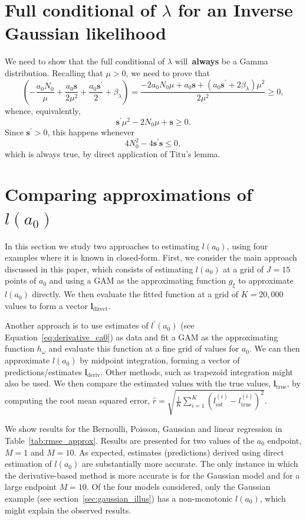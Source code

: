 \documentclass[a4paper, notitlepage, 11pt]{article}
\begin{document}
\section{Full conditional of $\lambda$ for an Inverse Gaussian likelihood}
\label{sec:full_cond_invGaussian}

We need to show that the full conditional of $\lambda$ will~\textbf{always} be a Gamma distribution.
Recalling that $\mu > 0$, we need to prove that 
\[ \left( -\frac{a_0N_0}{\mu} + \frac{a_0\boldsymbol s }{2\mu^2} + \frac{a_0\boldsymbol s^\prime}{2} + \beta_\lambda \right) = \frac{-2a_0N_0\mu + a_0\boldsymbol s + (a_0 \boldsymbol s^\prime + 2\beta_\lambda)\mu^2 }{2\mu^2} \geq 0,\]
whence, equivalently,
\[ \boldsymbol s^\prime\mu^2 -2N_0\mu + \boldsymbol s \geq 0. \]
Since $\boldsymbol s^\prime > 0$, this happens whenever
\[ 4N_0^2 - 4\boldsymbol s^\prime\boldsymbol s \leq 0, \]
which is always true, by direct application of Titu's lemma.


\section{Comparing approximations of $l(a_0)$}
\label{sec:derivative_only}

In this section we study two approaches to estimating $l(a_0)$, using four examples where it is known in closed-form.
First, we consider the main approach discussed in this paper, which consists of estimating $l(a_0)$ at a grid of $J = 15$ points of $a_0$ and using a GAM as the approximating function $g_\xi$ to approximate $l(a_0)$ directly.
We then evaluate the fitted function at a grid of $K = 20,000$ values to form a vector $\boldsymbol l_{\text{direct}}$.

Another approach is to use estimates of $l^\prime(a_0)$ (see Equation~\ref{eq:derivative_ca0}) as data and fit a GAM as the approximating function $h_\omega$ and evaluate this function at a fine grid of values for $a_0$.
We can then approximate $l(a_0)$ by midpoint integration, forming a vector of predictions/estimates $\boldsymbol l_{\text{deriv}}$.
Other methods, such as trapezoid integration might also be used.
We then compare the estimated values with the true values, $\boldsymbol l_{\text{true}}$, by computing the root mean squared error, $\hat{r} = \sqrt{\frac{1}{K} \sum_{i= 1}^K \left( l^{(i)}_{\text{est}} - l^{(i)}_{\text{true}} \right)^2 }$.

We show results for the Bernoulli, Poisson, Gaussian and linear regression in Table~\ref{tab:rmse_approx}.
Results are presented for two values of the $a_0$ endpoint, $M = 1$ and $M = 10$.
As expected, estimates (predictions) derived using direct estimation of $l(a_0)$ are substantially more accurate.
The only instance in which the derivative-based method is more accurate is for the Gaussian model and for a large endpoint $M = 10$.
Of the four models considered, only the Gaussian example (see section~\ref{sec:gaussian_illus}) has a non-monotonic $l(a_0)$, which might explain the observed results.
\end{document}
